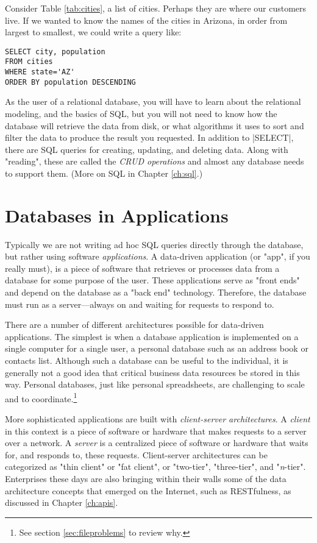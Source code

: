 \documentclass[11pt]{book}
\newcommand{\term}[1]{\emph{#1}} %
\begin{document}
Consider Table \ref{tab:cities}, a list of cities.  Perhaps they are where our customers live.  If we wanted to know the names of the cities in Arizona, in order from largest to smallest, we could write a query like:

\begin{verbatim}
SELECT city, population
FROM cities
WHERE state='AZ'
ORDER BY population DESCENDING
\end{verbatim}

As the user of a relational database, you will have to learn about the relational modeling, and the basics of SQL, but you will not need to know how the database will retrieve the data from disk, or what algorithms it uses to sort and filter the data to produce the result you requested.  In addition to |SELECT|, there are SQL queries for creating, updating, and deleting data.  Along with "reading", these are called the \term{CRUD operations} and almost any database needs to support them.  (More on SQL in Chapter \ref{ch:sql}.)


\section{Databases in Applications}

Typically we are not writing ad hoc SQL queries directly through the database, but rather using software \term{applications}.  A data-driven application (or "app", if you really must), is a piece of software that retrieves or processes data from a database for some purpose of the user.  These applications serve as "front ends" and depend on the database as a "back end" technology.  Therefore, the database must run as a server---always on and waiting for requests to respond to.

There are a number of different architectures possible for data-driven applications.  The simplest is when a database application is implemented on a single computer for a single user, a personal database such as an address book or contacts list.  Although such a database can be useful to the individual, it is generally not a good idea that critical business data resources be stored in this way.  Personal databases, just like personal spreadsheets, are challenging to scale and to coordinate.\footnote{See section \ref{sec:fileproblems} to review why.} 

More sophisticated applications are built with \term{client-server architectures}.  A \term{client} in this context is a piece of software or hardware that makes requests to a server over a network.  A \term{server} is a centralized piece of software or hardware that waits for, and responds to, these requests.  Client-server architectures can be categorized as "thin client" or "fat client", or "two-tier", "three-tier", and "\emph{n}-tier".  Enterprises these days are also bringing within their walls some of the data architecture concepts that emerged on the Internet, such as RESTfulness, as discussed in Chapter \ref{ch:apis}.
\end{document}
